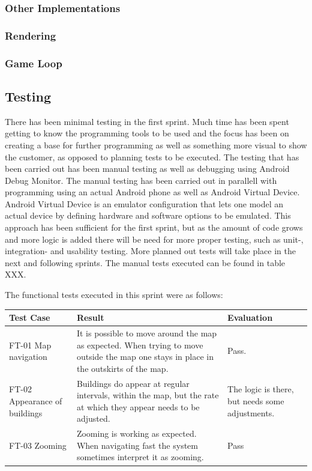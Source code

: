 \subsubsection*{Other Implementations}
	\subsubsection*{Rendering}
	\subsubsection*{Game Loop}

\subsection{Testing}

There has been minimal testing in the first sprint. Much time has been spent getting to know the programming tools to be used and the focus has been on creating a base for further programming as well as something more visual to show the customer, as opposed to planning tests to be executed. The testing that has been carried out has been manual testing as well as debugging using Android Debug Monitor. The manual testing has been carried out in parallell with programming using an actual Android phone as well as Android Virtual Device. Android Virtual Device is an emulator configuration that lets one model an actual device by defining hardware and software options to be emulated. This approach has been sufficient for the first sprint, but as the amount of code grows and more logic is added there will be need for more proper testing, such as unit-, integration- and usability testing. More planned out tests will take place in the next and following sprints. The manual tests executed can be found in table XXX.


The functional tests executed in this sprint were as follows:


\begin{tabular}{| p{2cm} | p{7cm} | p{2cm} |}
	\hline
	\rowcolor{lightgray}
	{\bf Test Case} & {\bf Result} & {\bf Evaluation} \\ \hline
	FT-01 Map navigation & It is possible to move around the map as expected. When trying to move outside the map one stays in place in the outskirts of the map. & Pass. \\ \hline
  	FT-02 Appearance of buildings & Buildings do appear at regular intervals, within the map, but the rate at which they appear needs to be adjusted. & The logic is there, but needs some adjustments. \\ \hline
	FT-03 Zooming & Zooming is working as expected. When navigating fast the system sometimes interpret it as zooming. & Pass \\ \hline
\end{tabular}

